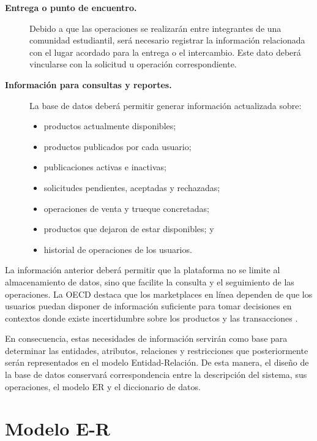 \documentclass[12pt]{article} %
\begin{document}
\begin{description}
    \item[\textbf{Entrega o punto de encuentro.}]
    
    Debido a que las operaciones se realizarán entre integrantes de una comunidad estudiantil, será necesario registrar la información relacionada con el lugar acordado para la entrega o el intercambio. Este dato deberá vincularse con la solicitud u operación correspondiente.

    \item[\textbf{Información para consultas y reportes.}]
    
    La base de datos deberá permitir generar información actualizada sobre:
    
    \begin{itemize}
        \item productos actualmente disponibles;
        \item productos publicados por cada usuario;
        \item publicaciones activas e inactivas;
        \item solicitudes pendientes, aceptadas y rechazadas;
        \item operaciones de venta y trueque concretadas;
        \item productos que dejaron de estar disponibles; y
        \item historial de operaciones de los usuarios.
    \end{itemize}
\end{description}

La información anterior deberá permitir que la plataforma no se limite al almacenamiento de datos, sino que facilite la consulta y el seguimiento de las operaciones. La OECD destaca que los marketplaces en línea dependen de que los usuarios puedan disponer de información suficiente para tomar decisiones en contextos donde existe incertidumbre sobre los productos y las transacciones \citep{oecd2019trust, oecd2022marketplaces}.

En consecuencia, estas necesidades de información servirán como base para determinar las entidades, atributos, relaciones y restricciones que posteriormente serán representados en el modelo Entidad-Relación. De esta manera, el diseño de la base de datos conservará correspondencia entre la descripción del sistema, sus operaciones, el modelo ER y el diccionario de datos.

\section{Modelo E-R}
\end{document}
